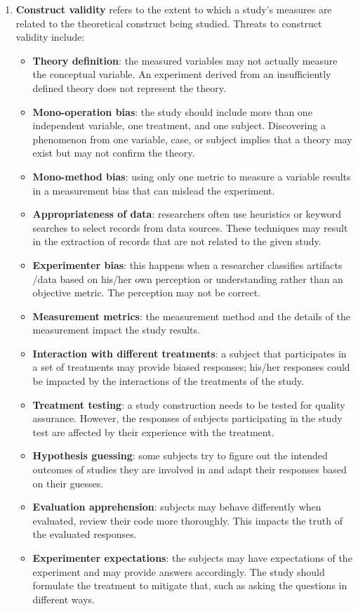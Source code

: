 \begin{enumerate}
    \item \textbf{Construct validity} refers to the extent to which a study's measures are related to the theoretical construct being studied. 
    Threats to construct validity include:
    \begin{itemize}
        \item \textbf{Theory definition}: the measured variables may not actually measure the conceptual variable. An experiment derived from an insufficiently defined theory does not represent the theory.
        \item \textbf{Mono-operation bias}: the study should include more than one independent variable, one treatment, and one subject. Discovering a phenomenon from one variable, case, or subject implies that a theory may exist but may not confirm the theory.
        \item \textbf{Mono-method bias}: using only one metric to measure a variable results in a measurement bias that can mislead the experiment.
        \item \textbf{Appropriateness of data}: researchers often use heuristics or keyword searches to select records from data sources. These techniques may result in the extraction of records that are not related to the given study.
        \item \textbf{Experimenter bias}: this happens when a researcher classifies artifacts /data based on his/her own perception or understanding rather than an objective metric. The perception may not be correct.
        \item \textbf{Measurement metrics}: the measurement method and the details of the measurement impact the study results.
        \item \textbf{Interaction with different treatments}: a subject that participates in a set of treatments may provide biased responses; his/her responses could be impacted by the interactions of the treatments of the study.
        \item \textbf{Treatment testing}: a study construction needs to be tested for quality assurance. However, the responses of subjects participating in the study test are affected by their experience with the treatment.
        \item \textbf{Hypothesis guessing}: some subjects try to figure out the intended outcomes of studies they are involved in and adapt their responses based on their guesses.
        \item \textbf{Evaluation apprehension}: subjects may behave differently when evaluated, \eg review their code more thoroughly. This impacts the truth of the evaluated responses.
        \item \textbf{Experimenter expectations}: the subjects may have expectations of the experiment and may provide answers accordingly. The study should formulate the treatment to mitigate that, such as asking the questions in different ways.
    \end{itemize}
    

\end{enumerate}
